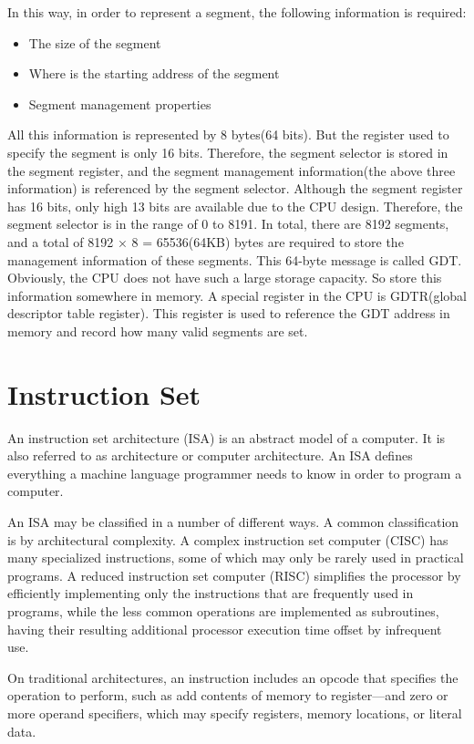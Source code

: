 \documentclass{swfcthesis}
\begin{document}
In this way, in order to represent a segment, the following information is required:
\begin{itemize}
\item The size of the segment
\item Where is the starting address of the segment
\item Segment management properties
\end{itemize}

All this information is represented by 8 bytes(64 bits). But the register used to specify
the segment is only 16 bits. Therefore, the segment selector is stored in the segment
register, and the segment management information(the above three information) is
referenced by the segment selector. Although the segment register has 16 bits, only high 13
bits are available due to the CPU design. Therefore, the segment selector is in the range
of 0 to 8191. In total, there are 8192 segments, and a total of 8192 × 8 = 65536(64KB) bytes are
required to store the management information of these segments. This 64-byte message is
called GDT. Obviously, the CPU does not have such a large storage capacity. So store this
information somewhere in memory. A special register in the CPU is GDTR(global descriptor
table register). This register is used to reference the GDT address in memory and record
how many valid segments are set.



\section{Instruction Set}

An instruction set architecture (ISA) is an abstract model of a computer. It is also
referred to as architecture or computer architecture. An ISA defines everything a machine
language programmer needs to know in order to program a computer.

An ISA may be classified in a number of different ways. A common classification is by
architectural complexity. A complex instruction set computer (CISC) has many specialized
instructions, some of which may only be rarely used in practical programs. A reduced
instruction set computer (RISC) simplifies the processor by efficiently implementing only
the instructions that are frequently used in programs, while the less common operations
are implemented as subroutines, having their resulting additional processor execution time
offset by infrequent use.

On traditional architectures, an instruction includes an opcode that specifies the
operation to perform, such as add contents of memory to register—and zero or more operand
specifiers, which may specify registers, memory locations, or literal data\cite{wiki:isa}.
\end{document}
